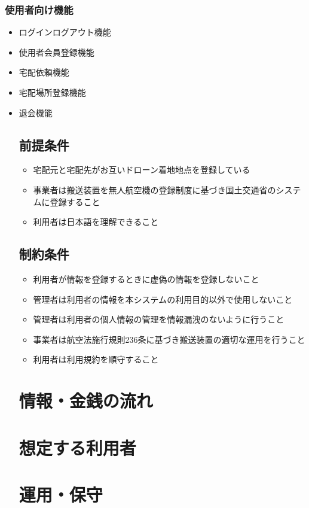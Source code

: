 \documentclass[a4paper, titlepage]{jsarticle}
\begin{document}
\subsubsection{使用者向け機能}
\begin{itemize}
    \item ログインログアウト機能
    \item 使用者会員登録機能
    \item 宅配依頼機能
    \item 宅配場所登録機能
    \item 退会機能

\subsection{前提条件}
\begin{itemize}
	\item 宅配元と宅配先がお互いドローン着地地点を登録している
	\item 事業者は搬送装置を無人航空機の登録制度に基づき国土交通省のシステムに登録すること
	\item 利用者は日本語を理解できること
\end{itemize}
\subsection{制約条件}
\begin{itemize}
	\item 利用者が情報を登録するときに虚偽の情報を登録しないこと
	\item 管理者は利用者の情報を本システムの利用目的以外で使用しないこと
	\item 管理者は利用者の個人情報の管理を情報漏洩のないように行うこと
	\item 事業者は航空法施行規則236条に基づき搬送装置の適切な運用を行うこと
	\item 利用者は利用規約を順守すること
\end{itemize}
\section{情報・金銭の流れ}

\section{想定する利用者}

\section{運用・保守}


\end{itemize}
\end{document}

